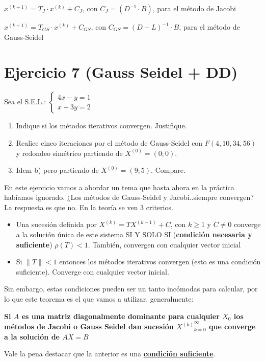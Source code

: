 \documentclass[11pt]{article}
\begin{document}
	$x^{(k+1)}=T_J\cdot x^{(k)} + C_J$, con $C_J=(D^{-1}\cdot B)$, para el método de Jacobi
	
	$x^{(k+1)}=T_{GS} \cdot x^{(k)} + C_{GS}$, con $C_{GS}=(D-L)^{-1}\cdot B$, para el método de Gauss-Seidel
	
	\section{Ejercicio 7 (Gauss Seidel + DD)}
	Sea el S.E.L.: $\begin{cases}
		4x-y=1\\
		x+3y=2
	\end{cases}$
	\begin{enumerate}[label=\alph*)]
		\item Indique si los métodos iterativos convergen. Justifique.
		\item Realice cinco iteraciones por el método de Gauss-Seidel con $F(4, 10, 34, 56)$ y redondeo simétrico partiendo de $X^{(0)}=(0;0)$.
		\item Idem b) pero partiendo de $X^{(0)}=(9;5)$. Compare.
	\end{enumerate}

	En este ejercicio vamos a abordar un tema que hasta ahora en la práctica habíamos ignorado. ¿Los métodos de Gauss-Seidel y Jacobi..siempre convergen? La respuesta es que no. En la teoría se ven 3 criterios.
	
	\begin{itemize}
		\item Una sucesión definida por $X^{(k)}=TX^{(k-1)} + C$, con $k\ge 1$ y $C\ne0$ converge a la solución única de este sistema SI Y SOLO SI (\textbf{condición necesaria y suficiente}) $\rho(T)<1$. También, convergen con cualquier vector inicial
		\item Si $\lVert T \rVert<1$ entonces los métodos iterativos convergen (esto es una condición suficiente). Converge con cualquier vector inicial.
	\end{itemize}

	Sin embargo, estas condiciones pueden ser un tanto incómodas para calcular, por lo que este teorema es el que vamos a utilizar, generalmente:
	
	\textbf{Si $A$ es una matriz diagonalmente dominante para cualquier $X_0$ los métodos de Jacobi o Gauss Seidel dan sucesión ${X^{(k)}}_{k=0}^{\infty}$ que converge a la solución de $AX=B$}
	
	Vale la pena destacar que la anterior es una \textbf{\underline{condición suficiente}}.
	
\end{document}
